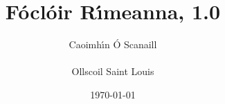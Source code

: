 \documentclass[10pt]{book}
\begin{document}
\begin{frontmatter}
\title{\Huge\bf F\'ocl\'oir R\'{\i}meanna, 1.0} %
\author{{\Large Caoimh\'{\i}n \'O Scanaill}\\ \\ {\Large Ollscoil Saint Louis}}
\date{\today}
\maketitle
\doclicenseThis
\end{frontmatter}

\begin{mainmatter}
\begin{enumerate}[label=\textbf{\arabic*}]

\end{enumerate}
\end{mainmatter}
\end{document}
